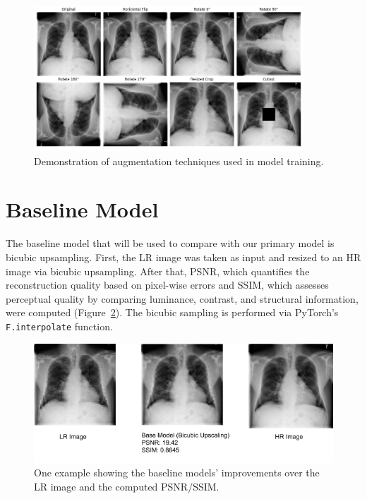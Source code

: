 \documentclass{article} %
\begin{document}
\begin{figure}[h!]
\centering
\includegraphics[width=0.9\textwidth]{Figs/augmentation.jpg}
\caption{Demonstration of augmentation techniques used in model training.}
\label{augmentations}
\end{figure}

\section{Baseline Model}

The baseline model that will be used to compare with our primary model is bicubic upsampling. First, the LR image was taken as input and resized to an HR image via bicubic upsampling. After that, PSNR, which quantifies the reconstruction quality based on pixel-wise errors and SSIM, which assesses perceptual quality by comparing luminance, contrast, and structural information, were computed (Figure~\ref{baseline}). The bicubic sampling is performed via PyTorch's \texttt{F.interpolate} function.

\begin{figure}[h]
\begin{center}
\includegraphics[width=1\textwidth]{progress/Figs/baseline.png}
\end{center}
\caption{One example showing the baseline models' improvements over the LR image and the computed PSNR/SSIM.}
\label{baseline}
\end{figure}
\end{document}
